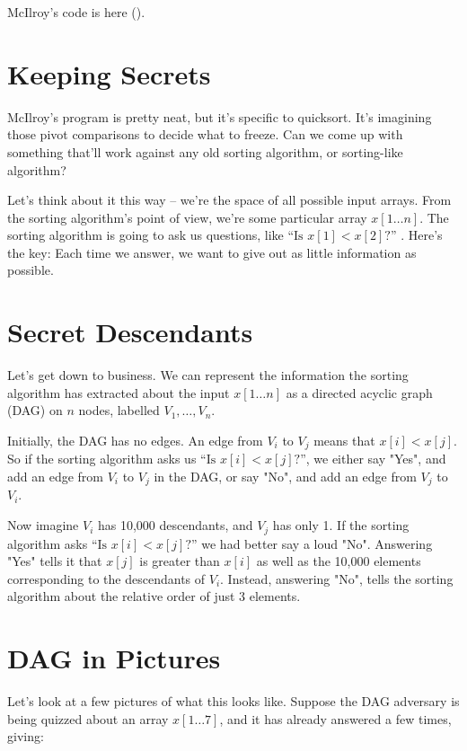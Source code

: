 \documentclass[11pt]{article}
\begin{document}
McIlroy's code is here (\texttt{}).
\section{Keeping Secrets}

McIlroy's program is pretty neat, but it's specific to quicksort. It's imagining those pivot comparisons to decide what to freeze. Can we come up with something that'll work against any old sorting algorithm, or sorting-like algorithm?

Let's think about it this way -- we're the space of all possible input arrays. From the sorting algorithm's point of view, we're some particular array $x[1\ldots n]$. The sorting algorithm is going to ask us questions, like $\mbox{``Is } x[1] < x[2]\mbox{?''}$ . Here's the key: Each time we answer, we want to give out as little information as possible.
\section{Secret Descendants}

Let's get down to business. We can represent the information the sorting algorithm has extracted about the input $x[1 \ldots n]$ as a directed acyclic graph (DAG) on $n$ nodes, labelled $V_1, \ldots, V_n$.

Initially, the DAG has no edges. An edge from $V_i$ to $V_j$ means that $x[i] < x[j]$. So if the sorting algorithm asks us $\mbox{``Is } x[i] < x[j]\mbox{?''}$, we either say "Yes", and add an edge from $V_i$ to $V_j$ in the DAG, or say "No", and add an edge from $V_j$ to $V_i$.

Now imagine $V_i$ has 10,000 descendants, and $V_j$ has only 1. If the sorting algorithm asks $\mbox{``Is } x[i] < x[j]\mbox{?''}$ we had better say a loud "No". Answering "Yes" tells it that $x[j]$ is greater than $x[i]$ as well as the 10,000 elements corresponding to the descendants of $V_i$. Instead, answering "No", tells the sorting algorithm about the relative order of just 3 elements.
\section{DAG in Pictures}

Let's look at a few pictures of what this looks like. Suppose the DAG adversary is being quizzed about an array $x[1\ldots 7]$, and it has already answered a few times, giving:
\begin{center}\end{center}
\end{document}

